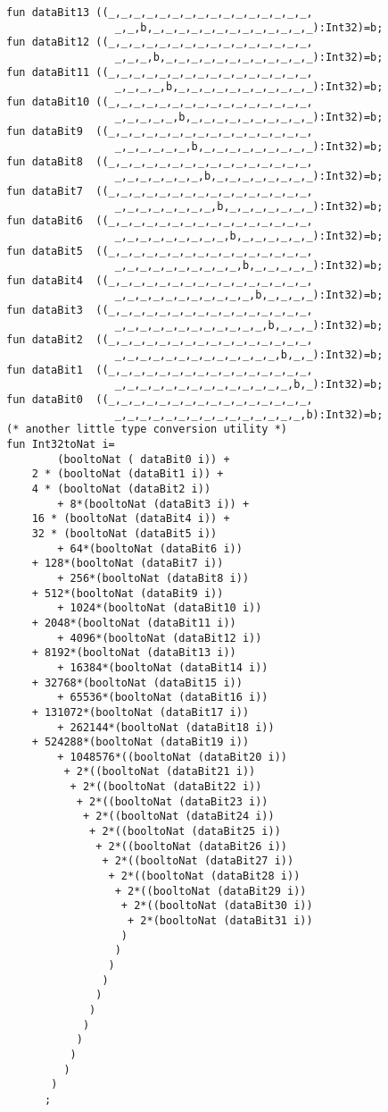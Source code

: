 \begin{verbatim}
fun dataBit13 ((_,_,_,_,_,_,_,_,_,_,_,_,_,_,_,_,
                 _,_,b,_,_,_,_,_,_,_,_,_,_,_,_,_):Int32)=b;
fun dataBit12 ((_,_,_,_,_,_,_,_,_,_,_,_,_,_,_,_,
                 _,_,_,b,_,_,_,_,_,_,_,_,_,_,_,_):Int32)=b;
fun dataBit11 ((_,_,_,_,_,_,_,_,_,_,_,_,_,_,_,_,
                 _,_,_,_,b,_,_,_,_,_,_,_,_,_,_,_):Int32)=b;
fun dataBit10 ((_,_,_,_,_,_,_,_,_,_,_,_,_,_,_,_,
                 _,_,_,_,_,b,_,_,_,_,_,_,_,_,_,_):Int32)=b;
fun dataBit9  ((_,_,_,_,_,_,_,_,_,_,_,_,_,_,_,_,
                 _,_,_,_,_,_,b,_,_,_,_,_,_,_,_,_):Int32)=b;
fun dataBit8  ((_,_,_,_,_,_,_,_,_,_,_,_,_,_,_,_,
                 _,_,_,_,_,_,_,b,_,_,_,_,_,_,_,_):Int32)=b;
fun dataBit7  ((_,_,_,_,_,_,_,_,_,_,_,_,_,_,_,_,
                 _,_,_,_,_,_,_,_,b,_,_,_,_,_,_,_):Int32)=b;
fun dataBit6  ((_,_,_,_,_,_,_,_,_,_,_,_,_,_,_,_,
                 _,_,_,_,_,_,_,_,_,b,_,_,_,_,_,_):Int32)=b;
fun dataBit5  ((_,_,_,_,_,_,_,_,_,_,_,_,_,_,_,_,
                 _,_,_,_,_,_,_,_,_,_,b,_,_,_,_,_):Int32)=b;
fun dataBit4  ((_,_,_,_,_,_,_,_,_,_,_,_,_,_,_,_,
                 _,_,_,_,_,_,_,_,_,_,_,b,_,_,_,_):Int32)=b;
fun dataBit3  ((_,_,_,_,_,_,_,_,_,_,_,_,_,_,_,_,
                 _,_,_,_,_,_,_,_,_,_,_,_,b,_,_,_):Int32)=b;
fun dataBit2  ((_,_,_,_,_,_,_,_,_,_,_,_,_,_,_,_,
                 _,_,_,_,_,_,_,_,_,_,_,_,_,b,_,_):Int32)=b;
fun dataBit1  ((_,_,_,_,_,_,_,_,_,_,_,_,_,_,_,_,
                 _,_,_,_,_,_,_,_,_,_,_,_,_,_,b,_):Int32)=b;
fun dataBit0  ((_,_,_,_,_,_,_,_,_,_,_,_,_,_,_,_,
                 _,_,_,_,_,_,_,_,_,_,_,_,_,_,_,b):Int32)=b;
(* another little type conversion utility *)
fun Int32toNat i=
        (booltoNat ( dataBit0 i)) + 
	2 * (booltoNat (dataBit1 i)) + 
	4 * (booltoNat (dataBit2 i))
        + 8*(booltoNat (dataBit3 i)) +
	16 * (booltoNat (dataBit4 i)) +
	32 * (booltoNat (dataBit5 i))
        + 64*(booltoNat (dataBit6 i)) 
	+ 128*(booltoNat (dataBit7 i))
        + 256*(booltoNat (dataBit8 i)) 
	+ 512*(booltoNat (dataBit9 i))
        + 1024*(booltoNat (dataBit10 i)) 
	+ 2048*(booltoNat (dataBit11 i))
        + 4096*(booltoNat (dataBit12 i)) 
	+ 8192*(booltoNat (dataBit13 i))
        + 16384*(booltoNat (dataBit14 i)) 
	+ 32768*(booltoNat (dataBit15 i))
        + 65536*(booltoNat (dataBit16 i)) 
	+ 131072*(booltoNat (dataBit17 i))
        + 262144*(booltoNat (dataBit18 i)) 
	+ 524288*(booltoNat (dataBit19 i))
        + 1048576*((booltoNat (dataBit20 i)) 
         + 2*((booltoNat (dataBit21 i))
          + 2*((booltoNat (dataBit22 i))
           + 2*((booltoNat (dataBit23 i))
            + 2*((booltoNat (dataBit24 i))
             + 2*((booltoNat (dataBit25 i))
              + 2*((booltoNat (dataBit26 i))
               + 2*((booltoNat (dataBit27 i))
                + 2*((booltoNat (dataBit28 i))
                 + 2*((booltoNat (dataBit29 i))
                  + 2*((booltoNat (dataBit30 i))
                   + 2*(booltoNat (dataBit31 i))
                  )
                 )
                )
               )
              )
             )
            )
           )
          )
         )
       ) 
      ;


\end{verbatim}
